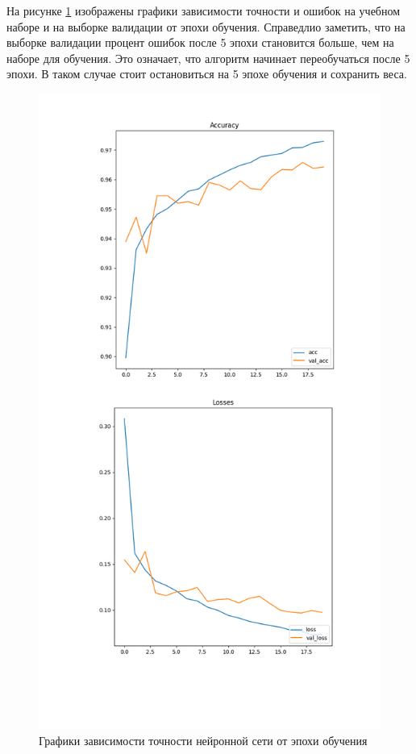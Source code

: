 На рисунке \ref{fig:5} изображены графики зависимости точности и ошибок на учебном наборе и на выборке валидации от эпохи обучения. Справедлио заметить, что на выборке валидации процент ошибок после 5 эпохи становится больше, чем на наборе для обучения. Это означает, что алгоритм начинает переобучаться после 5 эпохи. В таком случае стоит остановиться на 5 эпохе обучения и сохранить веса.
\begin{figure}[!h] 
  \center
  \includegraphics [scale=0.5] {img/val_acc_loss20.png}
  \caption{Графики зависимости точности нейронной сети от эпохи обучения} 
  \label{fig:5}  
\end{figure}

